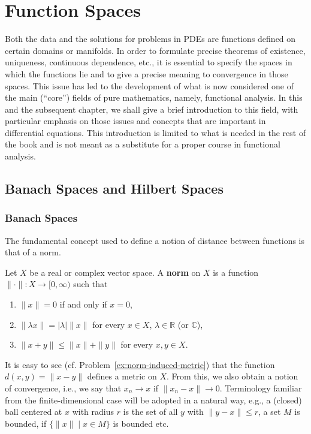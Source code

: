 \section{Function Spaces}\label{chap:function-spaces}

Both the data and the solutions for problems in PDEs are functions defined on certain domains or manifolds. In order to formulate precise theorems of existence, uniqueness, continuous dependence, etc., it is essential to specify the spaces in which the functions lie and to give a precise meaning to convergence in those spaces. This issue has led to the development of what is now considered one of the main (``core'') fields of pure mathematics, namely, functional analysis. In this and the subsequent chapter, we shall give a brief introduction to this field, with particular emphasis on those issues and concepts that are important in differential equations. This introduction is limited to what is needed in the rest of the book and is not meant as a substitute for a proper course in functional analysis.

\subsection{Banach Spaces and Hilbert Spaces}\label{sec:banach-hilbert-spaces}

\subsubsection{Banach Spaces}\label{subsec:banach-spaces}

The fundamental concept used to define a notion of distance between functions is that of a norm.

\begin{Definition}
\label{def:normed-vector-space-norm}
Let $X$ be a real or complex vector space. A \textbf{norm} on $X$ is a function $\|\cdot\|:X\to[0,\infty)$ such that\begin{enumerate}
\item $\|x\|=0$ if and only if $x=0$,
\item $\|\lambda x\|=|\lambda|\|x\|$ for every $x\in X$, $\lambda\in\mathbb{R}$ (or $\mathbb{C}$),
\item $\|x+y\|\leq\|x\|+\|y\|$ for every $x,y\in X$.
\end{enumerate}
\end{Definition}

It is easy to see (cf. Problem~\ref{ex:norm-induced-metric}) that the function $d(x,y)=\|x-y\|$ defines a metric on $X$. From this, we also obtain a notion of convergence, i.e., we say that $x_n\to x$ if $\|x_n-x\|\to0$. Terminology familiar from the finite-dimensional case will be adopted in a natural way, e.g., a (closed) ball centered at $x$ with radius $r$ is the set of all $y$ with $\|y-x\|\leq r$, a set $M$ is bounded, if $\{\|x\|\mid x\in M\}$ is bounded etc.

